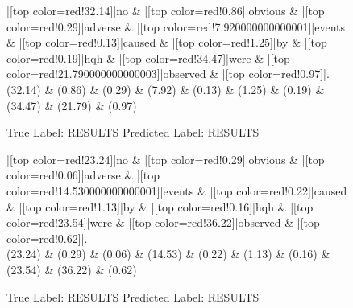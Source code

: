 \documentclass[a4paper, landscape]{article}
\begin{document}
\begin{figure}
\begin{center}
\begin{dependency}
\begin{deptext}
|[top color=red!32.14]|no \& |[top color=red!0.86]|obvious \& |[top color=red!0.29]|adverse \& |[top color=red!7.920000000000001]|events \& |[top color=red!0.13]|caused \& |[top color=red!1.25]|by \& |[top color=red!0.19]|hqh \& |[top color=red!34.47]|were \& |[top color=red!21.790000000000003]|observed \& |[top color=red!0.97]|.\\
(32.14) \& (0.86) \& (0.29) \& (7.92) \& (0.13) \& (1.25) \& (0.19) \& (34.47) \& (21.79) \& (0.97)\\
\end{deptext}
\end{dependency}
\end{center}
\caption{True Label: RESULTS Predicted Label: RESULTS}
\end{figure}
\clearpage
\begin{figure}
\begin{center}
\begin{dependency}
\begin{deptext}
|[top color=red!23.24]|no \& |[top color=red!0.29]|obvious \& |[top color=red!0.06]|adverse \& |[top color=red!14.530000000000001]|events \& |[top color=red!0.22]|caused \& |[top color=red!1.13]|by \& |[top color=red!0.16]|hqh \& |[top color=red!23.54]|were \& |[top color=red!36.22]|observed \& |[top color=red!0.62]|.\\
(23.24) \& (0.29) \& (0.06) \& (14.53) \& (0.22) \& (1.13) \& (0.16) \& (23.54) \& (36.22) \& (0.62)\\
\end{deptext}
\end{dependency}
\end{center}
\caption{True Label: RESULTS Predicted Label: RESULTS}
\end{figure}
\end{document}
